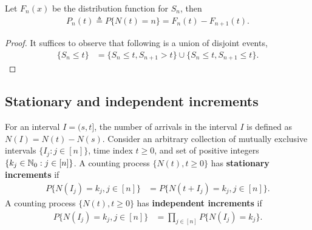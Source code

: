 \documentclass[a4paper,10pt,english]{article}
\begin{document}
\begin{lem}
Let $F_n(x)$ be the distribution function for $S_n$, then 
\begin{align*}
P_n(t) \triangleq P\{N(t) = n\} = F_{n}(t)-F_{n+1}(t).
\end{align*}
\end{lem}
\begin{proof} It suffices to observe that following is a union of disjoint events,
\begin{align*}
\{S_n \le t \} &= \{S_n \le t, S_{n+1} > t\} \cup \{S_{n} \le t, S_{n+1} \le t\}.
\end{align*}
\end{proof}

\subsection{Stationary and independent increments}
For an interval $I = (s,t]$, the number of arrivals in the interval $I$ is defined as $N(I) = N(t) - N(s)$. 
Consider an arbitrary collection of mutually exclusive intervals $\{I_j: j \in [n]\}$, time index $t \ge 0$, and set of positive integers $\{k_j \in \mathbb{N}_0 : j \in [n]\}$. 
A counting process $\{N(t), t\ge 0\}$ has \textbf{stationary increments} if
\begin{align*}
P\{N(I_j) = k_j, j \in [n]\} &= P\{N(t + I_j) = k_j, j \in [n]\}.
\end{align*}
A counting process $\{N(t), t\ge 0\}$ has \textbf{independent increments} if %
\begin{align*}
P\{N(I_j) = k_j, j \in [n]\} &= \prod_{j \in [n]}P\{N(I_j) = k_j\}.
\end{align*}
\end{document}
